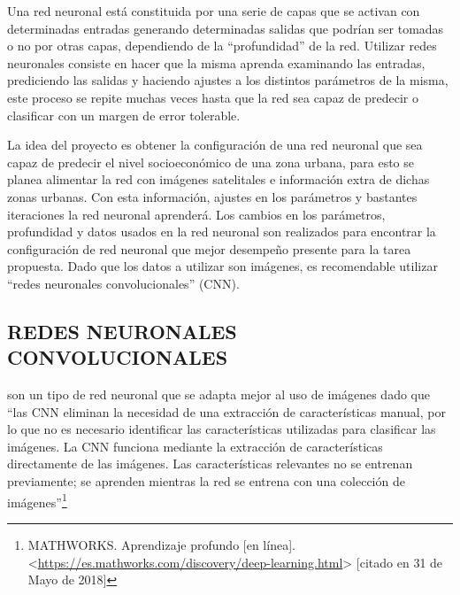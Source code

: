   

  Una red neuronal está constituida por una serie de capas que se activan con determinadas entradas generando determinadas salidas que podrían ser tomadas o no por otras capas, dependiendo de la “profundidad” de la red. Utilizar redes neuronales consiste en hacer que la misma aprenda examinando las entradas, prediciendo las salidas y haciendo ajustes a los distintos parámetros de la misma, este proceso se repite muchas veces hasta que la red sea capaz de predecir o clasificar con un margen de error tolerable.
  
  La idea del proyecto es obtener la configuración de una red neuronal que sea capaz de predecir el nivel socioeconómico de una zona urbana, para esto se planea alimentar la red con imágenes satelitales e información extra de dichas zonas urbanas. Con esta información, ajustes en los parámetros y bastantes iteraciones la red neuronal aprenderá. Los cambios en los parámetros, profundidad y datos usados en la red neuronal son realizados para encontrar la configuración de red neuronal que mejor desempeño presente para la tarea propuesta. Dado que los datos a utilizar son imágenes, es recomendable utilizar “redes neuronales convolucionales” (CNN).
  
 \subsection{REDES NEURONALES CONVOLUCIONALES}   
son un tipo de red neuronal que se adapta mejor al uso de imágenes dado que “las CNN eliminan la necesidad de una extracción de características manual, por lo que no es necesario identificar las características utilizadas para clasificar las imágenes. La CNN funciona mediante la extracción de características directamente de las imágenes. Las características relevantes no se entrenan previamente; se aprenden mientras la red se entrena con una colección de imágenes”\footnote[12]{MATHWORKS. Aprendizaje profundo [en línea]. <\url{https://es.mathworks.com/discovery/deep-learning.html}> [citado en 31 de Mayo de 2018]} 


